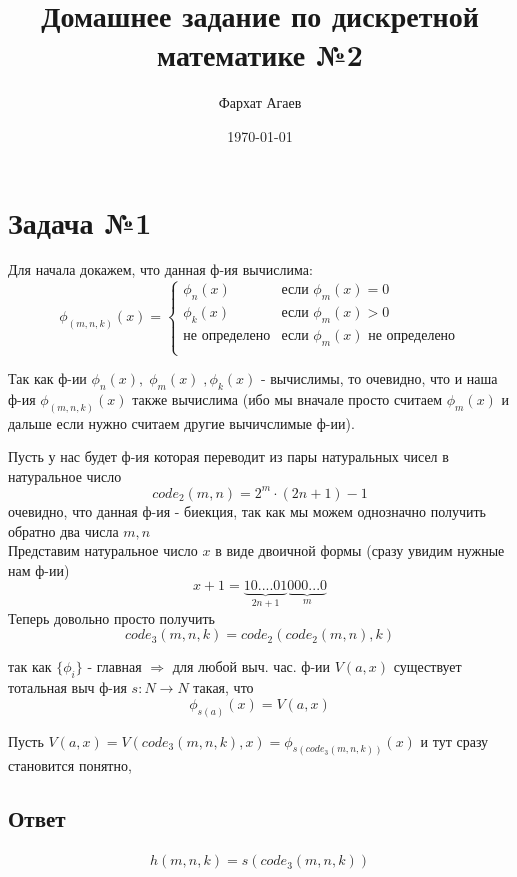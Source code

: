 \documentclass[a4paper,12pt]{article} %
\author{Фархат Агаев}
\title{Домашнее задание по дискретной математике №2}
\date{\today}
\begin{document}

\maketitle
\newpage
\section*{Задача №1}
Для начала докажем, что данная ф-ия вычислима:
\begin{equation*}
    \phi_{(m,n,k)}(x) = 
    \begin{cases}
        \phi_n(x) & \text{если } \phi_m(x) = 0 \\
        \phi_k(x) & \text{если } \phi_m(x) > 0 \\
        \text{не определено}& \text{если } \phi_m(x) \text{ не определено} \\
    \end{cases}
\end{equation*}

Так как ф-ии $\phi_n(x), \; \phi_m(x) \;, \phi_k(x)$ - вычислимы, то очевидно,
что и наша ф-ия $\phi_{(m,n,k)}(x)$ также вычислима (ибо мы вначале просто считаем $\phi_m(x)$ и дальше если нужно 
считаем другие вычичслимые ф-ии). 

Пусть у нас будет ф-ия которая переводит из пары натуральных чисел в натуральное число
\[ code_2(m,n) = 2^m \cdot (2n + 1) - 1\]
очевидно, что данная ф-ия - биекция, так как мы можем однозначно получить обратно два числа $m, n$ \\
Представим натуральное число $x$ в виде двоичной формы (сразу увидим нужные нам ф-ии)
\[ x  + 1 = \underbrace{10....01}_{2n + 1} \underbrace{000...0}_m\]
Теперь довольно просто получить \[code_3(m, n, k) = code_2(code_2(m, n), k)\]

\noindent так как $\{\phi_i\}$ - главная $\Rightarrow$ для любой выч. час. ф-ии $V(a, x)$ 
существует тотальная выч ф-ия $s: N \rightarrow N$ такая, что 
\[ \phi_{s(a)}(x) = V(a, x)\]

Пусть $V(a, x) = V(code_3(m, n, k), x) = \phi_{s(code_3(m,n,k))}(x)$ и тут сразу становится понятно, 
\subsection*{Ответ} 
\begin{align*}
    h(m, n, k) = s(code_3(m, n, k))
\end{align*}
\end{document}
